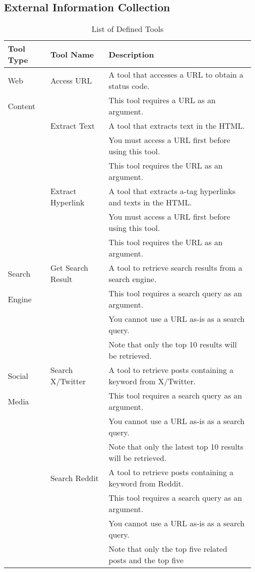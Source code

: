 \documentclass[runningheads]{llncs}
\begin{document}
\subsection{ External Information Collection}
\label{subsec:tool}
\begin{table}[!t]
\scriptsize
\tabcolsep=0.5mm
\centering
\caption{List of Defined Tools}
{\renewcommand\arraystretch{0.85}
\begin{tabular}{lll} \toprule
Tool Type & Tool Name & Description \\ \midrule
Web & Access URL & A tool that accesses a URL to obtain a status code. \\
Content & & This tool requires a URL as an argument. \\
& Extract Text & A tool that extracts text in the HTML. \\
& & You must access a URL first before using this tool. \\
& & This tool requires the URL as an argument. \\
& Extract Hyperlink & A tool that extracts a-tag hyperlinks and texts in the HTML.\\
& & You must access a URL first before using this tool. \\
& & This tool requires the URL as an argument. \\ \midrule
Search & Get Search Result & A tool to retrieve search results from a search engine.\\
Engine & & This tool requires a search query as an argument. \\
& & You cannot use a URL as-is as a search query. \\
& & Note that only the top 10 results will be retrieved. \\ \midrule
Social & Search X/Twitter & A tool to retrieve posts containing a keyword from X/Twitter. \\
Media & & This tool requires a search query as an argument. \\
& & You cannot use a URL as-is as a search query. \\
& & Note that only the latest top 10 results will be retrieved. \\
& Search Reddit & A tool to retrieve posts containing a keyword from Reddit. \\
& & This tool requires a search query as an argument. \\
& & You cannot use a URL as-is as a search query. \\
& & Note that only the top five related posts and the top five \\

\end{tabular}}
\end{table}
\end{document}
